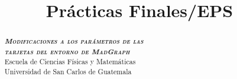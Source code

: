\documentclass[osajnl,showpacs,superscriptaddress,10pt]{revtex4-2}
\begin{document}
\title{Prácticas Finales/EPS}
\begin{abstract}
    \begin{center}
        \vspace{295pt}
        \Large \textbf{\textit{\textsc{Modificaciones a los parámetros de las\\tarjetas  del entorno de MadGraph}}} \normalsize
        \vspace{295pt}
        \\
        \Large Escuela de Ciencias Físicas y Matemáticas \normalsize
        \\
        \large Universidad de San Carlos de Guatemala \normalsize
    \end{center}
\end{abstract}
\maketitle

\pagestyle{fancy}
\fancyhf{}
\fancyfoot[LE,RO]{\hfill\thepage\hfill}
\renewcommand{\footruleskip}{3pt}
\renewcommand{\footrulewidth}{1pt}

\newpage
\tableofcontents
\newpage


\newpage

\newpage

\newpage

\newpage

% 

\end{document}
